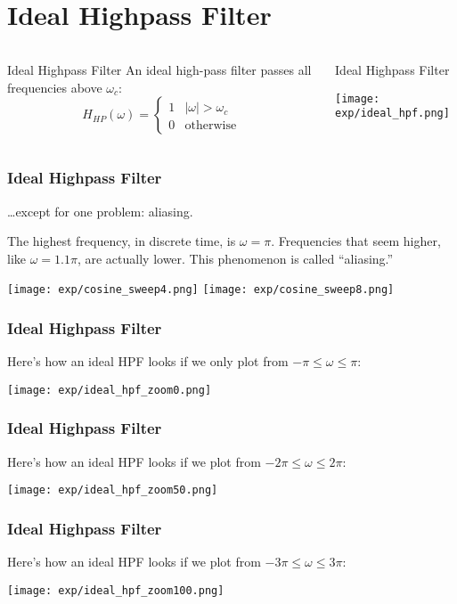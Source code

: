 \documentclass{beamer}
\begin{document}
\section[Ideal HPF]{Ideal Highpass Filter}
\setcounter{subsection}{1}

\begin{frame}
  \begin{columns}
    \column{2.25in}
    \begin{block}{Ideal Highpass Filter}
      An ideal high-pass filter passes all frequencies above $\omega_c$:
      \[
      H_{HP}(\omega)
      = \begin{cases} 1& |\omega|>\omega_c\\
        0 & \mbox{otherwise}
      \end{cases}
      \]
    \end{block}
    \column{2.25in}
    \begin{block}{Ideal Highpass Filter}
      \centerline{\texttt{[image: exp/ideal\_hpf.png]}}
    \end{block}
  \end{columns}
\end{frame}

\begin{frame}
  \frametitle{Ideal Highpass Filter}

  \ldots except for one problem: aliasing.
  
  The highest frequency, in discrete time, is $\omega=\pi$.
  Frequencies that seem higher, like $\omega=1.1\pi$, are actually
  lower.  This phenomenon is called ``aliasing.''

  \centerline{\texttt{[image: exp/cosine\_sweep4.png]}
    \texttt{[image: exp/cosine\_sweep8.png]}}
\end{frame}

\begin{frame}
  \frametitle{Ideal Highpass Filter}
  Here's how an ideal HPF looks if we only plot from $-\pi\le\omega\le\pi$:

  \centerline{\texttt{[image: exp/ideal\_hpf\_zoom0.png]}}
\end{frame}
\begin{frame}
  \frametitle{Ideal Highpass Filter}
  Here's how an ideal HPF looks if we plot from $-2\pi\le\omega\le2\pi$:

  \centerline{\texttt{[image: exp/ideal\_hpf\_zoom50.png]}}
\end{frame}
\begin{frame}
  \frametitle{Ideal Highpass Filter}
  Here's how an ideal HPF looks if we plot from $-3\pi\le\omega\le3\pi$:

  \centerline{\texttt{[image: exp/ideal\_hpf\_zoom100.png]}}
\end{frame}
\end{document}
